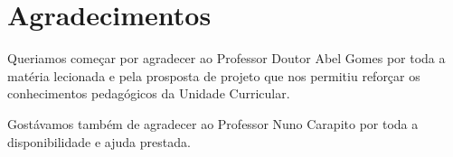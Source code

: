 \chapter*{Agradecimentos}
\label{chap:ack}

Queriamos começar por agradecer ao Professor Doutor Abel Gomes por toda a matéria lecionada e pela prosposta de projeto que nos permitiu reforçar os conhecimentos pedagógicos da Unidade Curricular.

Gostávamos também de agradecer ao Professor Nuno Carapito por toda a disponibilidade e ajuda prestada.